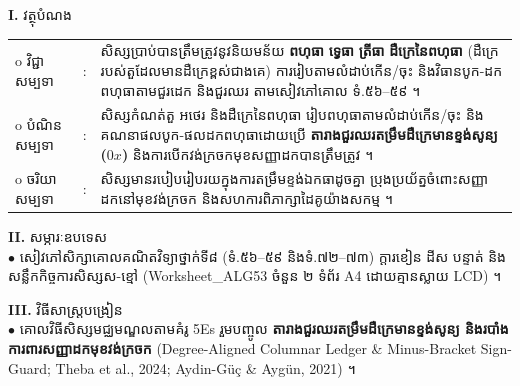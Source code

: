 \documentclass[a4paper,10pt]{article}
\newcommand{\wcirc}{{\CourierBullet\fontsize{9.5pt}{11pt}\selectfont o}}
\newcommand{\en}[1]{{\TimesEn #1}}
\begin{document}
\textbf{I.} {\muol វត្ថុបំណង}\\[1pt]
\hspace*{0.55cm}%
\begin{tabular}{@{}l l L{14.2cm}@{}}
  \wcirc \hspace{0.25cm} វិជ្ជាសម្បទា & : & សិស្សប្រាប់បានត្រឹមត្រូវនូវនិយមន័យ \textbf{ពហុធា} \textbf{ទ្វេធា} \textbf{ត្រីធា} \textbf{ដឺក្រេនៃពហុធា} (ដឺក្រេរបស់តួដែលមានដឺក្រេខ្ពស់ជាងគេ) ការរៀបតាមលំដាប់កើន/ចុះ និងវិធានបូក-ដកពហុធាតាមជួរដេក និងជួរឈរ តាមសៀវភៅគោល ទំ.៥៦--៥៩ ។ \\
  \wcirc \hspace{0.25cm} បំណិនសម្បទា & : & សិស្សកំណត់តួ អថេរ និងដឺក្រេនៃពហុធា រៀបពហុធាតាមលំដាប់កើន/ចុះ និងគណនាផលបូក-ផលដកពហុធាដោយប្រើ \textbf{តារាងជួរឈរតម្រឹមដឺក្រេមានខ្ទង់សូន្យ ($0x$)} និងការបើកវង់ក្រចកមុខសញ្ញាដកបានត្រឹមត្រូវ ។ \\
  \wcirc \hspace{0.25cm} ចរិយាសម្បទា & : & សិស្សមានរបៀបរៀបរយក្នុងការតម្រឹមខ្ទង់ឯកធាដូចគ្នា ប្រុងប្រយ័ត្នចំពោះសញ្ញាដកនៅមុខវង់ក្រចក និងសហការពិភាក្សាដៃគូយ៉ាងសកម្ម ។ \\
\end{tabular}

\vspace{1pt}

\textbf{II.} {\muol សម្ភារៈឧបទេស}\\[1pt]
\hspace*{0.55cm}$\bullet$ \hspace{0.35cm} សៀវភៅសិក្សាគោលគណិតវិទ្យាថ្នាក់ទី៨ (ទំ.៥៦--៥៩ និងទំ.៧២--៧៣) ក្ដារខៀន ដីស បន្ទាត់ និងសន្លឹកកិច្ចការសិស្សស-ខ្មៅ (\en{Worksheet\_ALG53} ចំនួន ២ ទំព័រ \en{A4} ដោយគ្មានស្លាយ \en{LCD}) ។

\vspace{1pt}

\textbf{III.} {\muol វិធីសាស្រ្តបង្រៀន}\\[1pt]
\hspace*{0.55cm}$\bullet$ \hspace{0.35cm} គោលវិធីសិស្សមជ្ឈមណ្ឌលតាមគំរូ \en{5Es} រួមបញ្ចូល \textbf{តារាងជួរឈរតម្រឹមដឺក្រេមានខ្ទង់សូន្យ និងរបាំងការពារសញ្ញាដកមុខវង់ក្រចក} (\en{Degree-Aligned Columnar Ledger \& Minus-Bracket Sign-Guard}; \en{Theba et al., 2024; Aydin-G\"u\c{c} \& Ayg\"un, 2021}) ។

\vspace{2pt}
\end{document}

